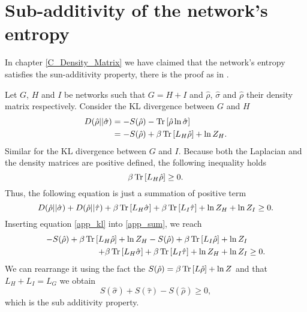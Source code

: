 \chapter{Sub-additivity of the network's entropy}\label{C_sub_additivity}
In chapter \ref{C_Density_Matrix} we have claimed that the network's entropy satisfies the sun-additivity property, there is the proof as in \cite{De_Domenico_2016}.

Let $G$, $H$ and $I$ be networks such that $G = H + I$ and $\hat\rho$, $\hat\sigma$ and $\hat\rho$ their density matrix respectively.
Consider the KL divergence between $G$ and $H$
\begin{equation}\label{app_kl}
    \begin{aligned}
        D(\hat\rho||\hat\sigma) &= - S(\hat\rho)- \operatorname{Tr}\left[\hat\rho\ln\hat\sigma\right] \\
        &= - S(\hat\rho)+ \beta\operatorname{Tr}\left[L_H\hat\rho\right] + \ln Z_H .
    \end{aligned}
\end{equation}
Similar for the KL divergence between $G$ and $I$. Because both the Laplacian and the density matrices are positive defined, the following inequality holds
\begin{equation}
    \beta\operatorname{Tr}\left[L_H\hat\rho\right]  \geq 0.
\end{equation}
Thus, the following equation is just a summation of positive term
\begin{equation}\label{app_sum}
    D(\hat\rho||\hat\sigma)+D(\hat\rho||\hat\tau) +\beta\operatorname{Tr}\left[L_H\hat\sigma\right] +\beta\operatorname{Tr}\left[L_I\hat\tau\right] +\ln Z_H +\ln Z_I\geq 0.
\end{equation} 
Inserting equation \eqref{app_kl} into \eqref{app_sum}, we reach
\begin{equation}
    \begin{split}
        - S(\hat\rho)+ \beta\operatorname{Tr}\left[L_H\hat\rho\right] + \ln Z_H - S(\hat\rho) +\beta\operatorname{Tr}\left[L_I\hat\rho\right] + \ln Z_I& \\
        +\beta\operatorname{Tr}\left[L_H\hat\sigma\right] +\beta\operatorname{Tr}\left[L_I\hat\tau\right] +\ln Z_H +\ln Z_I&\geq 0.
    \end{split}
\end{equation}
We can rearrange it using the fact the $S(\hat\rho) = \beta \operatorname{Tr}\left[L\hat\rho\right] + \ln Z$ and that $L_H + L_I = L_G$ we obtain
\begin{equation}
    S(\hat\sigma) + S(\hat\tau) -  S(\hat\rho)\geq 0,
\end{equation}
which is the sub additivity property.
